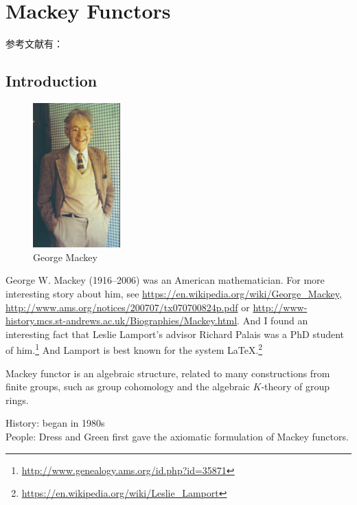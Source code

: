 \chapter{Mackey Functors} %
\label{cha:mackey_functors}
参考文献有：\cite{li-2015}

\section{Introduction} %
\label{sec:introduction}
\begin{figure}[htbp]
	\centering
	\includegraphics[width=0.3\textwidth]{Mackey.jpg}
	\caption{George Mackey}
\end{figure}
George W. Mackey (1916–2006) was an American mathematician. For more interesting story about him, see \url{https://en.wikipedia.org/wiki/George_Mackey}, \url{http://www.ams.org/notices/200707/tx070700824p.pdf} or \url{http://www-history.mcs.st-andrews.ac.uk/Biographies/Mackey.html}. And I found an interesting fact that Leslie Lamport's advisor Richard Palais was a PhD student of him.\footnote{\url{http://www.genealogy.ams.org/id.php?id=35871}} And Lamport is best known for the system \LaTeX.\footnote{\url{https://en.wikipedia.org/wiki/Leslie_Lamport}}


Mackey functor is an algebraic structure, related to many constructions from finite groups, such as group cohomology and the algebraic $K$-theory of group rings.

History: began in 1980s\\
People:  Dress and Green first gave the axiomatic formulation of Mackey functors.







